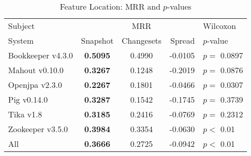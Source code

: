 \begin{table}[t]
\centering
\caption{Feature Location: MRR and $p$-values}
\begin{tabular}{l|ccr|l}
\toprule
Subject & & MRR & & Wilcoxon  \\
System  &  Snapshot & Changesets & Spread & $p$-value  \\
\midrule
Bookkeeper v4.3.0 & {\bf 0.5095 } & 0.4990 & -0.0105 & $p = $ 0.0897 \\
Mahout v0.10.0 & {\bf 0.3267 } & 0.1248 & -0.2019 & $p = $ 0.0876 \\
Openjpa v2.3.0 & {\bf 0.2267 } & 0.1801 & -0.0466 & $p = $ 0.0307 \\
Pig v0.14.0 & {\bf 0.3287 } & 0.1542 & -0.1745 & $p = $ 0.3739 \\
Tika v1.8 & {\bf 0.3185 } & 0.2416 & -0.0769 & $p = $ 0.2312 \\
Zookeeper v3.5.0 & {\bf 0.3984 } & 0.3354 & -0.0630 & $p < $ 0.01 \\
\midrule
All & {\bf 0.3666 } & 0.2725 & -0.0942 & $p < $ 0.01 \\
\bottomrule
\end{tabular}
\label{table:feature_location_rq1}
\end{table}
